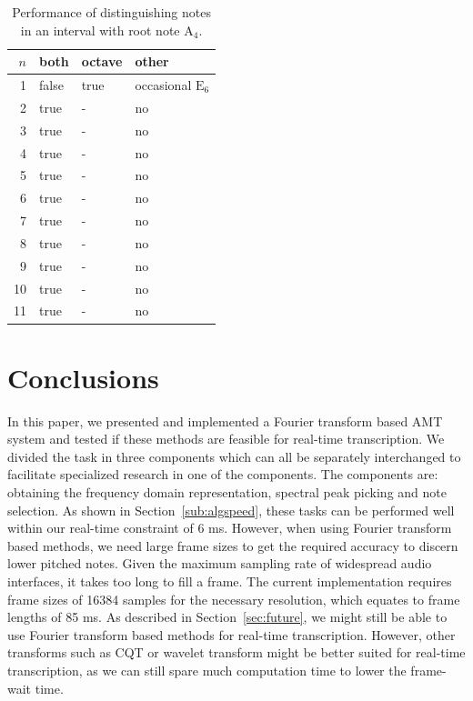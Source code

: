 \documentclass[10pt,twocolumn]{article}
\begin{document}
\vspace{-3mm}
\begin{table}[H]
    \centering
    \begin{tabular}{r|lll}
        $n$ & both & octave & other \\
        \hline
        1  & false & true & occasional $\text{E}_6$ \\
        2  & true & - & no \\
        3  & true & - & no \\
        4  & true & - & no \\
        5  & true & - & no \\
        6  & true & - & no \\
        7  & true & - & no \\
        8  & true & - & no \\
        9  & true & - & no \\
        10 & true & - & no \\
        11 & true & - & no
    \end{tabular}
    \caption{Performance of distinguishing notes in an interval with root note $\text{A}_4$.}
    \label{tab:polperf3}
\end{table}%


\section{Conclusions}
In this paper, we presented and implemented a Fourier transform based AMT system and tested if these methods are feasible for real-time transcription. We divided the task in three components which can all be separately interchanged to facilitate specialized research in one of the components. The components are: obtaining the frequency domain representation, spectral peak picking and note selection. As shown in Section~\ref{sub:algspeed}, these tasks can be performed well within our real-time constraint of 6 ms. However, when using Fourier transform based methods, we need large frame sizes to get the required accuracy to discern lower pitched notes. Given the maximum sampling rate of widespread audio interfaces, it takes too long to fill a frame. The current implementation requires frame sizes of 16384 samples for the necessary resolution, which equates to frame lengths of 85 ms. As described in Section~\ref{sec:future}, we might still be able to use Fourier transform based methods for real-time transcription. However, other transforms such as CQT or wavelet transform might be better suited for real-time transcription, as we can still spare much computation time to lower the frame-wait time.
\end{document}
